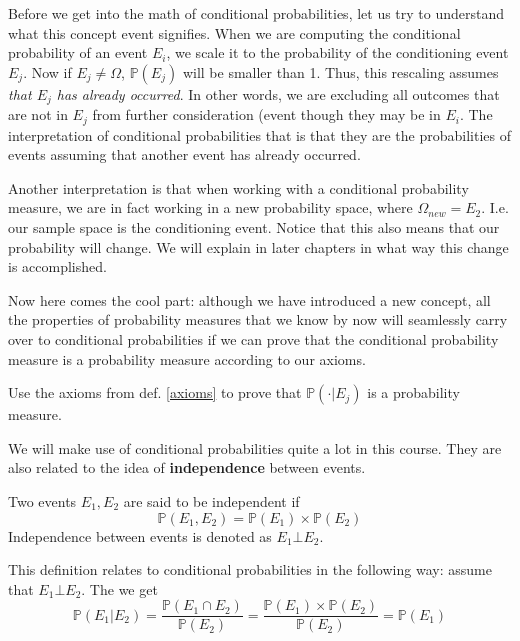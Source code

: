 \documentclass[a4paper,11pt,leqno]{report}
\begin{document}
Before we get into the math of conditional probabilities, let us try to understand what this concept event
signifies. When we are computing the conditional probability of an event $ E_{i} $, we scale it to the 
probability of the conditioning event $ E_{j} $. Now if $ E_{j} \not = \Omega $, $ \mathbb{P}(E_{j}) $
will be smaller than 1. Thus, this rescaling assumes \textit{that $ E_{j} $ has already occurred}. In other
words, we are excluding all outcomes that are not in $ E_{j} $ from further consideration (event though they
may be in $ E_{i} $. The interpretation of conditional probabilities that is that they are the probabilities
of events assuming that another event has already occurred.

Another interpretation is that when working with a conditional probability measure, we are in fact working
in a new probability space, where $ \Omega_{new} = E_{2} $. I.e. our sample space is the conditioning event.
Notice that this also means that our probability will change. We will explain in later chapters in what
way this change is accomplished.

Now here comes the cool part: although we have introduced a new concept, all the properties of probability
measures that we know by now will seamlessly carry over to conditional probabilities if we can prove
that the conditional probability measure is a probability measure according to our axioms.

\begin{Exercise}
Use the axioms from def. \ref{axioms} to prove that $ \mathbb{P}(\cdot|E_{j}) $ is a probability measure.
\end{Exercise} 

We will make use of conditional probabilities quite a lot in this course. They are also related to the
idea of \textbf{independence} between events.

\begin{Definition}
Two events $ E_{1}, E_{2} $ are said to be independent if 
$$ \mathbb{P}(E_{1}, E_{2}) = \mathbb{P}(E_{1}) \times \mathbb{P}(E_{2}) $$
Independence between events is denoted as $ E_{1} \bot E_{2} $.
\end{Definition}

This definition relates to conditional probabilities in the following way: assume that $ E_{1} \bot E_{2} $.
The we get
\begin{equation}
\mathbb{P}(E_{1}|E_{2}) = \dfrac{\mathbb{P}(E_{1} \cap E_{2})}{\mathbb{P}(E_{2})}
= \dfrac{\mathbb{P}(E_{1}) \times \mathbb{P}(E_{2})}{\mathbb{P}(E_{2})} = \mathbb{P}(E_{1})
\end{equation}
\end{document}
